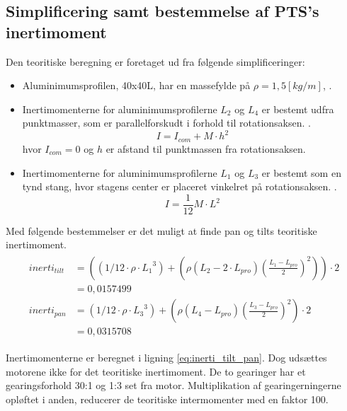 \subsection{Simplificering samt bestemmelse af PTS's inertimoment}
Den teoritiske beregning er foretaget ud fra følgende simplificeringer:
\begin{itemize}
\item Aluminimumsprofilen, 40x40L, har en massefylde på $\rho=1,5 [kg/m]$, \citep[Kap. 2 side. 4]{alu_profil_desitet}. 
\item Inertimomenterne for aluminimumsprofilerne ${L_{2}}$ og ${L_{4}}$ er bestemt udfra punktmasser, som er parallelforskudt i forhold til rotationsaksen. \citep[Side. 254, ligning 10-36]{fund_of_physics}.
\begin{equation}
I={ I }_{ com }+M\cdot { h }^{ 2 }
\label{eq:punktmasse_para} 
\end{equation}
hvor ${I_{com}} = 0$ og $h$ er afstand til punktmassen fra rotationsaksen.
\item Inertimomenterne for aluminimumsprofilerne ${L_{1}}$ og ${L_{3}}$ er bestemt som en tynd stang, hvor stagens center er placeret vinkelret på rotationsaksen. \citep[Side. 255, tabel 10-2e]{fund_of_physics}.
\begin{equation}
I=\frac { 1 }{ 12 } M\cdot { L }^{ 2 }
\label{eq:punktmasse_para} 
\end{equation}
\end{itemize}

Med følgende bestemmelser er det muligt at finde pan og tilts teoritiske inertimoment.
\begin{align}
\label{eq:inerti_tilt_pan}
\begin{split}
{ inerti }_{ tilt } &= \left( \left( 1/12\cdot \rho \cdot { {L_{1}} }^{ 3 } \right) +\left( \rho \left( {L_{2}}-2\cdot {L_{pro}} \right) { \left( \frac { {L_{1}}-{L_{pro}}}{ 2 }  \right)  }^{ 2 } \right)  \right) \cdot 2
\\
 &= 0,0157499
\\
{ inerti }_{ pan }&=\left( 1/12\cdot \rho \cdot { { L }_{ 3 } }^{ 3 } \right) +\left( \rho \left( { L }_{ 4 }-{ L }_{ pro } \right) { \left( \frac { { L }_{ 3 }-{ L }_{ pro } }{ 2 }  \right)  }^{ 2 } \right) \cdot 2
\\
 &=0,0315708
\end{split}
\end{align}




Inertimomenterne er beregnet i ligning \ref{eq:inerti_tilt_pan}. Dog udsættes motorene ikke for det teoritiske inertimoment. De to gearinger har et gearingsforhold 30:1 og 1:3 set fra motor. Multiplikation af gearingerningerne opløftet i anden, reducerer de teoritiske intermomenter med en faktor 100.  

